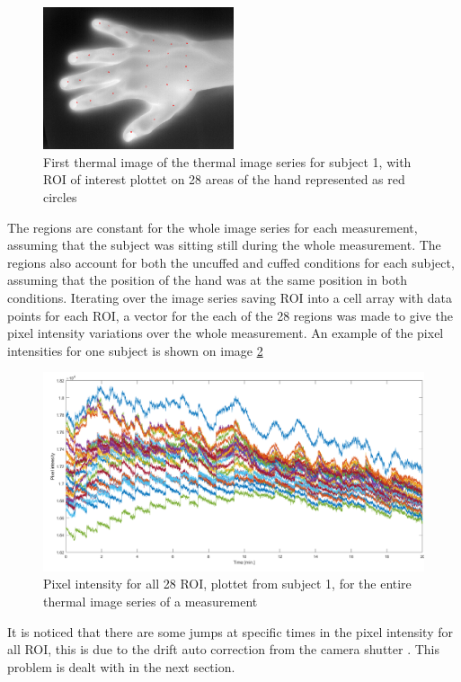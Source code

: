 \begin{figure}[H]
	\includegraphics[width=0.5\textwidth]{figures/roiHand}  %
	\caption{First thermal image of the thermal image series for subject 1, with ROI of interest plottet on 28 areas of the hand represented as red circles}
	\label{fig:roiHand}  %
\end{figure}

The regions are constant for the whole image series for each measurement, assuming that the subject was sitting still during the whole measurement. The regions also account for both the uncuffed and cuffed conditions for each subject, assuming that the position of the hand was at the same position in both conditions. 
Iterating over the image series saving ROI into a cell array with data points for each ROI, a vector for the each of the 28 regions was made to give the pixel intensity variations over the whole measurement. 
An example of the pixel intensities for one subject is shown on image \ref{fig:Intensities}

\begin{figure}[H]
	\includegraphics[width=1\textwidth]{figures/Intensities}  %
	\caption{Pixel intensity for all 28 ROI, plottet from subject 1, for the entire thermal image series of a measurement}
	\label{fig:Intensities}  %
\end{figure}

It is noticed that there are some jumps at specific times in the pixel intensity for all ROI, this is due to the drift auto correction from the camera shutter . This problem is dealt with in the next section. %